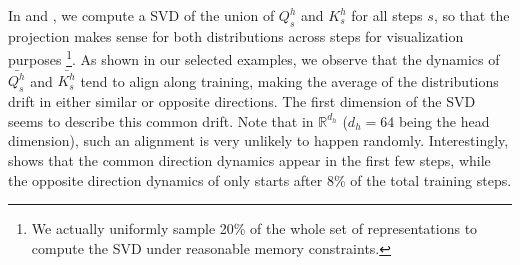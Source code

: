 In  and , we compute a SVD of the union of $Q^h_s$ and $K^h_s$ for all steps $s$, so that the projection makes sense for both distributions across steps for visualization purposes \footnote{We actually uniformly sample 20\% of the whole set of representations to compute the SVD under reasonable memory constraints.}. As shown in our selected examples, we observe that the dynamics of $\bar{Q^h_s}$ and $\bar{K^h_s}$ tend to align along training, making the average of the distributions drift in either similar or opposite directions. The first dimension of the SVD seems to describe this common drift. Note that in $\mathbb{R}^{d_h}$ ($d_h = 64$ being the head dimension), such an alignment is very unlikely to happen randomly. Interestingly,  shows that the common direction dynamics appear in the first few steps, while the opposite direction dynamics of   only starts after 8\% of the total training steps.

